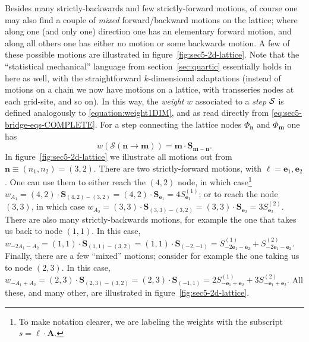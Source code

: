 \documentclass[11pt,a4paper]{article}
\newcommand{\CS}{{\cal S}}
\newcommand{\be}{\begin{equation}}
\newcommand{\ee}{\end{equation}}
\begin{document}
Besides many strictly-backwards and few strictly-forward motions, of course one may also find a couple of \textit{mixed} forward/backward motions on the lattice; where along one (and only one) direction one has an elementary forward motion, and along all others one has either no motion or some backwards motion. A few of these possible motions are illustrated in figure~\ref{fig:sec5-2d-lattice}. Note that the ``statistical mechanical'' language from section~\ref{sec:quartic} essentially holds in here as well, with the straightforward $k$-dimensional adaptations (instead of motions on a chain we now have motions on a lattice, with transseries nodes at each grid-site, and so on). In this way, the \textit{weight} $w$ associated to a \textit{step} $\CS$ is defined analogously to \eqref{equation:weight1DIM}, and as read directly from \eqref{eq:sec5-bridge-eqs-COMPLETE}. For a step connecting the lattice nodes $\Phi_{\boldsymbol{n}}$ and $\Phi_{\boldsymbol{m}}$ one has
%
\be
\label{k-dim-weight!}
w \left( \mathcal{S} \left( \boldsymbol{n} \rightarrow \boldsymbol{m} \right) \right) = \boldsymbol{m} \cdot \boldsymbol{S}_{\boldsymbol{m} - \boldsymbol{n}}.
\ee
%
\noindent
In figure~\ref{fig:sec5-2d-lattice} we illustrate all motions out from $\boldsymbol{n} \equiv (n_{1},n_{2}) = (3,2)$. There are two strictly-forward motions, with $\boldsymbol{\ell} = \boldsymbol{e}_1, \boldsymbol{e}_2$. One can use them to either reach the $(4,2)$ node, in which case\footnote{To make notation clearer, we are labeling the weights with the subscript $s = \boldsymbol{\ell} \cdot \boldsymbol{A}$.} $w_{A_1} = (4,2) \cdot \boldsymbol{S}_{(4,2)-(3,2)} = (4,2) \cdot \boldsymbol{S}_{\boldsymbol{e}_1} = 4 S^{(1)}_{\boldsymbol{e}_1}$; or to reach the node $(3,3)$, in which case $w_{A_2} = (3,3) \cdot \boldsymbol{S}_{(3,3)-(3,2)} = (3,3) \cdot \boldsymbol{S}_{\boldsymbol{e}_2} = 3 S^{(2)}_{\boldsymbol{e}_2}$. There are also many strictly-backwards motions, for example the one that takes us back to node $(1,1)$. In this case, $w_{-2A_1-A_2} = (1,1) \cdot \boldsymbol{S}_{(1,1)-(3,2)} = (1,1) \cdot \boldsymbol{S}_{(-2,-1)} = S^{(1)}_{-2 \boldsymbol{e}_1-\boldsymbol{e}_2} + S^{(2)}_{-2 \boldsymbol{e}_1-\boldsymbol{e}_2}$. Finally, there are a few ``mixed'' motions; consider for example the one taking us to node $(2,3)$. In this case, $w_{-A_1+A_2} = (2,3) \cdot \boldsymbol{S}_{(2,3)-(3,2)} = (2,3) \cdot \boldsymbol{S}_{(-1,1)} = 2 S^{(1)}_{-\boldsymbol{e}_1+\boldsymbol{e}_2} + 3 S^{(2)}_{-\boldsymbol{e}_1+\boldsymbol{e}_2}$. All these, and many other, are illustrated in figure~\ref{fig:sec5-2d-lattice}.
\end{document}
